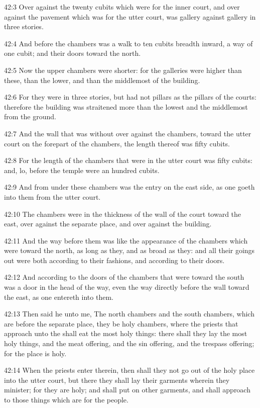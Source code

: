42:3 Over against the twenty cubits which were for the inner court, and over against the pavement which was for the utter court, was gallery against gallery in three stories.

42:4 And before the chambers was a walk to ten cubits breadth inward, a way of one cubit; and their doors toward the north.

42:5 Now the upper chambers were shorter: for the galleries were higher than these, than the lower, and than the middlemost of the building.

42:6 For they were in three stories, but had not pillars as the pillars of the courts: therefore the building was straitened more than the lowest and the middlemost from the ground.

42:7 And the wall that was without over against the chambers, toward the utter court on the forepart of the chambers, the length thereof was fifty cubits.

42:8 For the length of the chambers that were in the utter court was fifty cubits: and, lo, before the temple were an hundred cubits.

42:9 And from under these chambers was the entry on the east side, as one goeth into them from the utter court.

42:10 The chambers were in the thickness of the wall of the court toward the east, over against the separate place, and over against the building.

42:11 And the way before them was like the appearance of the chambers which were toward the north, as long as they, and as broad as they: and all their goings out were both according to their fashions, and according to their doors.

42:12 And according to the doors of the chambers that were toward the south was a door in the head of the way, even the way directly before the wall toward the east, as one entereth into them.

42:13 Then said he unto me, The north chambers and the south chambers, which are before the separate place, they be holy chambers, where the priests that approach unto the \LORD shall eat the most holy things: there shall they lay the most holy things, and the meat offering, and the sin offering, and the trespass offering; for the place is holy.

42:14 When the priests enter therein, then shall they not go out of the holy place into the utter court, but there they shall lay their garments wherein they minister; for they are holy; and shall put on other garments, and shall approach to those things which are for the people.

